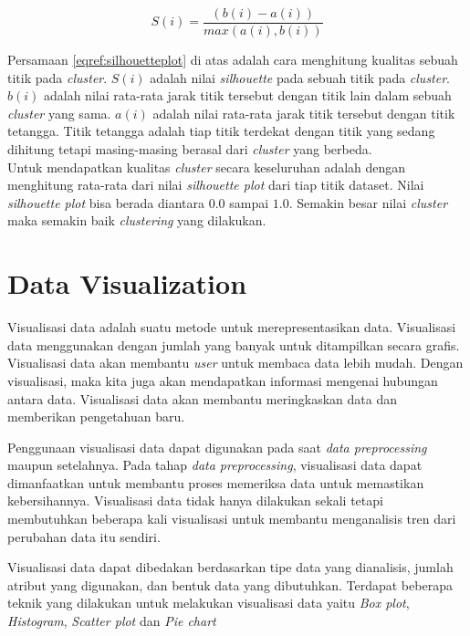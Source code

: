 \begin{equation}
  S(i) = \frac{(b(i)-a(i))}{max(a(i),b(i))}
\label{eqref:silhouetteplot}
\end{equation}

Persamaan \eqref{eqref:silhouetteplot} di atas adalah cara menghitung kualitas sebuah titik pada \textit{cluster}. $S(i)$ adalah nilai \textit{silhouette} pada sebuah titik pada \textit{cluster}. $b(i)$ adalah nilai rata-rata jarak titik tersebut dengan titik lain dalam sebuah \textit{cluster} yang sama. $a(i)$ adalah nilai rata-rata jarak titik tersebut dengan titik tetangga. Titik tetangga adalah tiap titik terdekat dengan titik yang sedang dihitung tetapi masing-masing berasal dari \textit{cluster} yang berbeda. \\

Untuk mendapatkan kualitas \textit{cluster} secara keseluruhan adalah dengan menghitung rata-rata dari nilai \textit{silhouette plot} dari tiap titik dataset. Nilai \textit{silhouette plot} bisa berada diantara $0.0$ sampai $1.0$.  Semakin besar nilai \textit{cluster} maka semakin baik \textit{clustering} yang dilakukan.

\section{Data Visualization \cite{han2012mining} } 
Visualisasi data adalah suatu metode untuk merepresentasikan data. Visualisasi data menggunakan dengan jumlah yang banyak untuk ditampilkan secara grafis. Visualisasi data akan membantu \textit{user} untuk membaca data lebih mudah. Dengan visualisasi, maka kita juga akan mendapatkan informasi mengenai hubungan antara data. Visualisasi data akan membantu meringkaskan data dan memberikan pengetahuan baru. 
		
Penggunaan visualisasi data dapat digunakan pada saat \textit{data preprocessing} maupun setelahnya. Pada tahap \textit{data preprocessing}, visualisasi data dapat dimanfaatkan untuk membantu proses memeriksa data untuk memastikan kebersihannya. Visualisasi data tidak hanya dilakukan sekali tetapi membutuhkan beberapa kali visualisasi untuk membantu menganalisis tren dari perubahan data itu sendiri. 
		
 Visualisasi data dapat dibedakan berdasarkan tipe data yang dianalisis, jumlah atribut yang digunakan, dan bentuk data yang dibutuhkan. Terdapat beberapa teknik yang dilakukan untuk melakukan visualisasi data yaitu \textit{Box plot}, \textit{Histogram}, \textit{Scatter plot} dan \textit{Pie chart} \\
 
